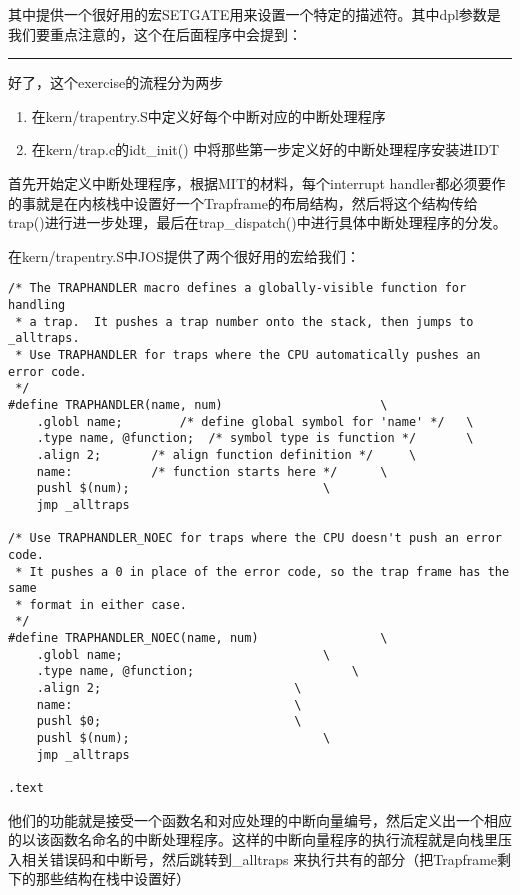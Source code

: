 \documentclass{article}
\newcommand{\funcname}[1]{{\ttfamily \small #1}}
\begin{document}
\begin{CJK*}{UTF8}{gkai}
其中提供一个很好用的宏SETGATE用来设置一个特定的描述符。其中dpl参数是我们要重点注意的，这个在后面程序中会提到：

\vspace{3em}

\hrule

\vspace{3em}

好了，这个exercise的流程分为两步

\begin{enumerate}
\item{在kern/trapentry.S中定义好每个中断对应的中断处理程序}
\item{在kern/trap.c的\funcname{idt\_init()} 中将那些第一步定义好的中断处理程序安装进IDT}
\end{enumerate}


首先开始定义中断处理程序，根据MIT的材料，每个interrupt handler都必须要作的事就是在内核栈中设置好一个Trapframe的布局结构，然后将这个结构传给\funcname{trap()}进行进一步处理，最后在\funcname{trap\_dispatch()}中进行具体中断处理程序的分发。

在kern/trapentry.S中JOS提供了两个很好用的宏给我们：


\begin{lstlisting}[style=acode, title={\scriptsize \ttfamily \bfseries kern/trapentry.S}]
/* The TRAPHANDLER macro defines a globally-visible function for handling
 * a trap.  It pushes a trap number onto the stack, then jumps to _alltraps.
 * Use TRAPHANDLER for traps where the CPU automatically pushes an error code.
 */ 
#define TRAPHANDLER(name, num)						\
	.globl name;		/* define global symbol for 'name' */	\
	.type name, @function;	/* symbol type is function */		\
	.align 2;		/* align function definition */		\
	name:			/* function starts here */		\
	pushl $(num);							\
	jmp _alltraps

/* Use TRAPHANDLER_NOEC for traps where the CPU doesn't push an error code.
 * It pushes a 0 in place of the error code, so the trap frame has the same
 * format in either case.
 */
#define TRAPHANDLER_NOEC(name, num)					\
	.globl name;							\
	.type name, @function;						\
	.align 2;							\
	name:								\
	pushl $0;							\
	pushl $(num);							\
	jmp _alltraps

.text
\end{lstlisting}

他们的功能就是接受一个函数名和对应处理的中断向量编号，然后定义出一个相应的以该函数名命名的中断处理程序。这样的中断向量程序的执行流程就是向栈里压入相关错误码和中断号，然后跳转到\funcname{\_alltraps} 来执行共有的部分（把Trapframe剩下的那些结构在栈中设置好）


\end{CJK*}
\end{document}
